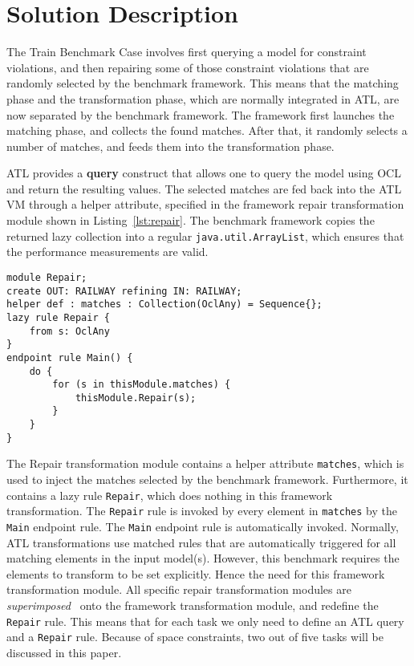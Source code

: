 \documentclass[submission,copyright,creativecommons]{eptcs}
\begin{document}
\section{Solution Description}
\label{sec:solution}

The Train Benchmark Case involves first querying a model for constraint violations, and then repairing some of those constraint violations that are randomly selected by the benchmark framework. This means that the matching phase and the transformation phase, which are normally integrated in ATL, are now separated by the benchmark framework. The framework first launches the matching phase, and collects the found matches. After that, it randomly selects a number of matches, and feeds them into the transformation phase.

ATL provides a \textbf{query} construct that allows one to query the model using OCL and return the resulting values. The selected matches are fed back into the ATL VM through a helper attribute, specified in the framework repair transformation module shown in Listing~\ref{lst:repair}. The benchmark framework copies the returned lazy collection into a regular \texttt{java.util.ArrayList}, which ensures that the performance measurements are valid.

\lstset{language=atl}
\begin{lstlisting}[float=htb, caption={Framework repair transformation module in ATL}, label=lst:repair, captionpos=b, frame=tb, belowskip=-10pt]
module Repair;
create OUT: RAILWAY refining IN: RAILWAY;
helper def : matches : Collection(OclAny) = Sequence{};
lazy rule Repair {
	from s: OclAny
}
endpoint rule Main() {
	do {
		for (s in thisModule.matches) {
			thisModule.Repair(s);
		}
	}
}
\end{lstlisting}

The Repair transformation module contains a helper attribute \texttt{matches}, which is used to inject the matches selected by the benchmark framework. Furthermore, it contains a lazy rule \texttt{Repair}, which does nothing in this framework transformation. The \texttt{Repair} rule is invoked by every element in \texttt{matches} by the \texttt{Main} endpoint rule. The \texttt{Main} endpoint rule is automatically invoked. Normally, ATL transformations use matched rules that are automatically triggered for all matching elements in the input model(s). However, this benchmark requires the elements to transform to be set explicitly. Hence the need for this framework transformation module. All specific repair transformation modules are \emph{superimposed}~\cite{journal/sosym/Wagelaar2009} onto the framework transformation module, and redefine the \texttt{Repair} rule. This means that for each task we only need to define an ATL query and a \texttt{Repair} rule. Because of space constraints, two out of five tasks will be discussed in this paper.
\end{document}
